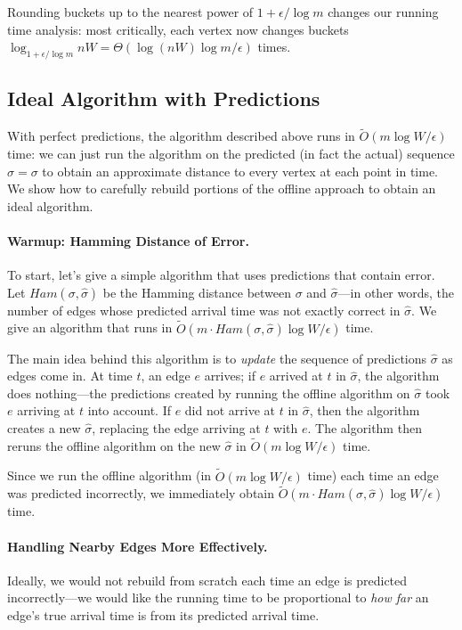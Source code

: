 \documentclass[11pt]{article}
\begin{document}
Rounding buckets up to the nearest power of $1 + \epsilon/\log m$ changes our running time analysis: most critically, each vertex now changes buckets $\log_{1 + \epsilon/\log m} nW = \Theta(\log(nW) \log m/\epsilon)$ times.  

\subsection{Ideal Algorithm with Predictions}

With perfect predictions, the algorithm described above runs in $\tilde{O}(m\log W/\epsilon)$ time: we can just run the algorithm on the predicted (in fact the actual) sequence $\hat{\sigma} = \sigma$ to obtain an approximate distance to every vertex at each point in time.  
We show how to carefully rebuild portions of the offline approach to obtain an ideal algorithm.

\paragraph{Warmup: Hamming Distance of Error.}  To start, let's give a simple algorithm that uses predictions that contain error.  
Let $Ham(\sigma, \hat{\sigma})$ be the Hamming distance between $\sigma$ and $\hat{\sigma}$---in other words, the number of edges whose predicted arrival time was not exactly correct in $\hat{\sigma}$.  We give an algorithm that runs in $\tilde{O}(m\cdot Ham(\sigma, \hat{\sigma})\log W/\epsilon)$ time.

The main idea behind this algorithm is to \emph{update} the sequence of predictions $\hat{\sigma}$ as edges come in.  At time $t$, an edge $e$ arrives; if $e$ arrived at $t$ in $\hat{\sigma}$, the algorithm does nothing---the predictions created by running the offline algorithm on $\hat{\sigma}$ took $e$ arriving at $t$ into account.  If $e$ did not arrive at $t$ in $\hat{\sigma}$, then the algorithm creates a new $\hat{\sigma}$, replacing the edge arriving at $t$ with $e$.  The algorithm then reruns the offline algorithm on the new $\hat{\sigma}$ in $\tilde{O}(m\log W/\epsilon)$ time.

Since we run the offline algorithm (in $\tilde{O}(m\log W/\epsilon)$ time) each time an edge was predicted incorrectly, we immediately obtain $\tilde{O}(m\cdot Ham(\sigma, \hat{\sigma})\log W/\epsilon)$ time.

\paragraph{Handling Nearby Edges More Effectively.}
Ideally, we would not rebuild from scratch each time an edge is predicted incorrectly---we would like the running time to be proportional to \emph{how far} an edge's true arrival time is from its predicted arrival time.  
\end{document}
